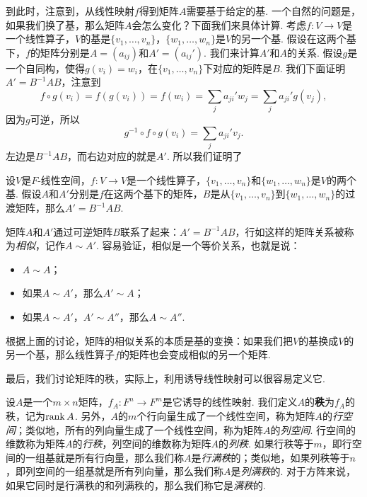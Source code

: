 到此时，注意到，从线性映射$f$得到矩阵$A$需要基于给定的基. 一个自然的问题是，如果我们换了基，那么矩阵$A$会怎么变化？下面我们来具体计算. 考虑$f:V\to V$是一个线性算子，$V$的基是$\{v_1,\dots,v_n\}$，$\{w_1,\dots,w_n\}$是$V$的另一个基. 假设在这两个基下，$f$的矩阵分别是$A=(a_{ij})$和$A'=(a_{ij}')$. 我们来计算$A'$和$A$的关系. 假设$g$是一个自同构，使得$g(v_i)=w_i$，在$\{v_1,\dots,v_n\}$下对应的矩阵是$B$. 我们下面证明$A'=B^{-1}AB$，注意到
\[f\circ g(v_i)=f(g(v_i))=f(w_i)=\sum_{j}a_{ji}'w_j=\sum_{j}a_{ji}'g(v_j),\]
因为$g$可逆，所以
\[g^{-1}\circ f\circ g(v_i)=\sum_{j}a_{ji}'v_j.\]
左边是$B^{-1}AB$，而右边对应的就是$A'$. 所以我们证明了

\begin{theorem}\label{thm:base-change}
    设$V$是$F$-线性空间，$f:V\to V$是一个线性算子，$\{v_1,\dots,v_n\}$和$\{w_1,\dots,w_n\}$是$V$的两个基. 假设$A$和$A'$分别是$f$在这两个基下的矩阵，$B$是从$\{v_1,\dots,v_n\}$到$\{w_1,\dots,w_n\}$的过渡矩阵，那么$A'=B^{-1}AB$. 
\end{theorem}

矩阵$A$和$A'$通过可逆矩阵$B$联系了起来：$A'=B^{-1}AB$，行如这样的矩阵关系被称为\emph{相似}，记作$A\sim A'$. 容易验证，相似是一个等价关系，也就是说：
\begin{itemize}
    \item $A\sim A$；
    \item 如果$A\sim A'$，那么$A'\sim A$；
    \item 如果$A\sim A'$，$A'\sim A''$，那么$A\sim A''$.
\end{itemize}
根据上面的讨论，矩阵的相似关系的本质是基的变换：如果我们把$V$的基换成$V$的另一个基，那么线性算子$f$的矩阵也会变成相似的另一个矩阵. 

最后，我们讨论矩阵的秩，实际上，利用诱导线性映射可以很容易定义它. 

\begin{definition}[矩阵的秩]
    设$A$是一个$m\times n$矩阵，$f_A:F^n\to F^m$是它诱导的线性映射. 我们定义$A$的\textbf{秩}为$f_A$的秩，记为$\operatorname*{rank} A$. 另外，$A$的$m$个行向量生成了一个线性空间，称为矩阵$A$的\emph{行空间}；类似地，所有的列向量生成了一个线性空间，称为矩阵$A$的\emph{列空间}. 行空间的维数称为矩阵$A$的\emph{行秩}，列空间的维数称为矩阵$A$的\emph{列秩}. 如果行秩等于$m$，即行空间的一组基就是所有行向量，那么我们称$A$是\emph{行满秩}的；类似地，如果列秩等于$n$，即列空间的一组基就是所有列向量，那么我们称$A$是\emph{列满秩}的. 对于方阵来说，如果它同时是行满秩的和列满秩的，那么我们称它是\emph{满秩}的. 
\end{definition}

